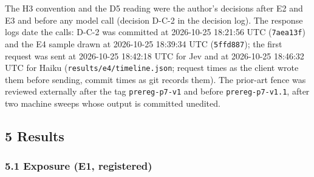 \documentclass[
  10pt,
]{article}
\begin{document}
The H3 convention and the D5 reading were the author's decisions after
E2 and E3 and before any model call (decision D-C-2 in the decision
log). The response logs date the calls: D-C-2 was committed at
2026-10-25 18:21:56 UTC (\texttt{7aea13f}) and the E4 sample drawn at
2026-10-25 18:39:34 UTC (\texttt{5ffd887}); the first request was sent
at 2026-10-25 18:42:18 UTC for Jev and at 2026-10-25 18:46:32 UTC for
Haiku (\texttt{results/e4/timeline.json}; request times as the client
wrote them before sending, commit times as git records them). The
prior-art fence was reviewed externally after the tag
\texttt{prereg-p7-v1} and before \texttt{prereg-p7-v1.1}, after two
machine sweeps whose output is committed unedited.

\hypertarget{results}{%
\subsection{5 Results}\label{results}}

\hypertarget{exposure-e1-registered}{%
\subsubsection{5.1 Exposure (E1,
registered)}\label{exposure-e1-registered}}
\end{document}
